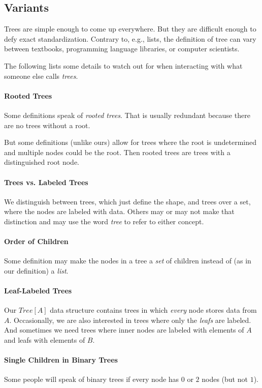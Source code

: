 \subsection{Variants}

Trees are simple enough to come up everywhere.
But they are difficult enough to defy exact standardization.
Contrary to, e.g., lists, the definition of tree can vary between textbooks, programming language libraries, or computer scientists.

The following lists some details to watch out for when interacting with what someone else calls \emph{trees}.

\paragraph{Rooted Trees}
Some definitions speak of \emph{rooted trees}.
That is usually redundant because there are no trees without a root.

But some definitions (unlike ours) allow for trees where the root is undetermined and multiple nodes could be the root.
Then rooted trees are trees with a distinguished root node.

\paragraph{Trees vs. Labeled Trees}
We distinguish between trees, which just define the shape, and trees over a set, where the nodes are labeled with data.
Others may or may not make that distinction and may use the word \emph{tree} to refer to either concept.

\paragraph{Order of Children}
Some definition may make the nodes in a tree a \emph{set} of children instead of (as in our definition) a \emph{list}.

\paragraph{Leaf-Labeled Trees}
Our $Tree[A]$ data structure contains trees in which \emph{every} node stores data from $A$.
Occasionally, we are also interested in trees where only the \emph{leafs} are labeled.
And sometimes we need trees where inner nodes are labeled with elements of $A$ and leafs with elements of $B$.

\paragraph{Single Children in Binary Trees}
Some people will speak of binary trees if every node has $0$ or $2$ nodes (but not $1$).

